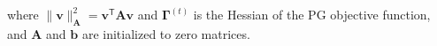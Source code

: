 \documentclass{aamas2016}
\newcommand{\transpose}{\text{$\mathsf{T}$}}
\newcommand{\st}[1]{\bm{s}^{(#1)}}
\begin{document}
where $\|\boldsymbol{v}\|_{\boldsymbol{A}}^{2}=\boldsymbol{v}^{\transpose}\boldsymbol{A}\boldsymbol{v}$ and $\boldsymbol{\Gamma}^{(t)}$ is 
the Hessian of the PG objective function, and $\boldsymbol{A}$ and $\boldsymbol{b}$ are initialized to zero matrices.


\end{document}
